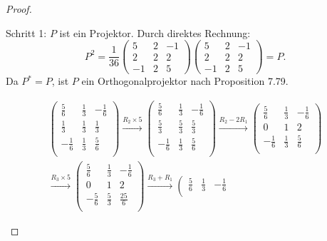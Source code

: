 \begin{proof}
	\begin{parts}
	\item Schritt 1: $P$ ist ein Projektor. Durch direktes Rechnung:
		\[
			P^2=\frac{1}{36}\begin{pmatrix} 5 & 2 & -1 \\ 2 & 2 & 2 \\ -1 & 2 & 5 \end{pmatrix} \begin{pmatrix} 5 & 2 & -1 \\ 2 & 2 & 2 \\ -1 & 2 & 5 \end{pmatrix}=P 
		.\]
	Da $P^*=P$, ist $P$ ein Orthogonalprojektor nach Proposition 7.79.
\item 
	\begin{gather*}
	\left(
\begin{array}{ccc}
 \frac{5}{6} & \frac{1}{3} & -\frac{1}{6} \\
 \frac{1}{3} & \frac{1}{3} & \frac{1}{3} \\
 -\frac{1}{6} & \frac{1}{3} & \frac{5}{6} \\
\end{array}
\right) \xrightarrow{R_2\times 5} \left(
\begin{array}{ccc}
 \frac{5}{6} & \frac{1}{3} & -\frac{1}{6} \\
 \frac{5}{3} & \frac{5}{3} & \frac{5}{3} \\
 -\frac{1}{6} & \frac{1}{3} & \frac{5}{6} \\
\end{array}
\right) \xrightarrow{R_2-2R_1} \left(
\begin{array}{ccc}
 \frac{5}{6} & \frac{1}{3} & -\frac{1}{6} \\
 0 & 1 & 2 \\
 -\frac{1}{6} & \frac{1}{3} & \frac{5}{6} \\
\end{array}
\right) \\\xrightarrow{R_3\times 5} \left(
\begin{array}{ccc}
 \frac{5}{6} & \frac{1}{3} & -\frac{1}{6} \\
 0 & 1 & 2 \\
 -\frac{5}{6} & \frac{5}{3} & \frac{25}{6} \\
\end{array}
\right) \xrightarrow{R_3+R_1} \left(
\begin{array}{ccc}
 \frac{5}{6} & \frac{1}{3} & -\frac{1}{6} \\

\end{array}
\end{gather*}
\end{parts}
\end{proof}
